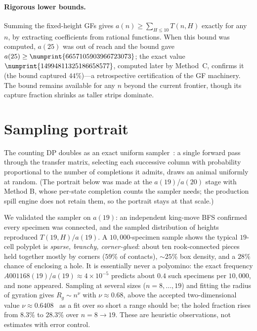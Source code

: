 \documentclass[11pt]{article}
\newcommand{\num}[1]{\numprint{#1}}
\begin{document}
\paragraph{Rigorous lower bounds.}
Summing the fixed-height GFs gives $a(n)\ge\sum_{H\le 10}T(n,H)$ exactly for
any $n$, by extracting coefficients from rational functions. When this bound
was computed, $a(25)$ was out of reach and the bound gave
$a(25)\ge\num{6657105903966723073}$; the exact value
$\num{14994811325186658577}$, computed later by Method~C, confirms it (the
bound captured $44\%$)---a retrospective certification of the GF machinery.
The bound remains available for any $n$ beyond the current frontier, though
its capture fraction shrinks as taller strips dominate.

\section{Sampling portrait}
\label{sec:sampling}

The counting DP doubles as an exact uniform sampler~\cite{nijenhuis}: a
single forward pass through the transfer matrix, selecting each successive
column with probability proportional to the number of completions it admits,
draws an animal uniformly at random. (The portrait below was made at the
$a(19)$/$a(20)$ stage with Method B, whose per-state completion counts the
sampler needs; the production spill engine does not retain them, so the
portrait stays at that scale.)

We validated the sampler on $a(19)$: an independent king-move BFS confirmed
every specimen was connected, and the sampled distribution of heights
reproduced $T(19,H)/a(19)$. A $10{,}000$-specimen sample shows the typical
$19$-cell polyplet is \emph{sparse, branchy, corner-glued}: about ten
rook-connected pieces held together mostly by corners ($59\%$ of contacts),
$\sim\!25\%$ box density, and a $28\%$ chance of enclosing a hole. It is
essentially never a polyomino: the exact frequency
$A001168(19)/a(19)\approx4\times10^{-5}$ predicts about $0.4$ such specimens
per $10{,}000$, and none appeared. Sampling at several sizes
($n=8,\dots,19$) and fitting the radius of gyration gives $R_g\sim n^{\nu}$
with $\nu\approx0.68$, above the accepted two-dimensional value
$\nu\approx0.6408$~\cite{jensen2001} as a fit over so short a range should
be; the holed fraction rises from $8.3\%$ to $28.3\%$ over $n=8\to19$.
These are heuristic observations, not estimates with error control.
\end{document}
